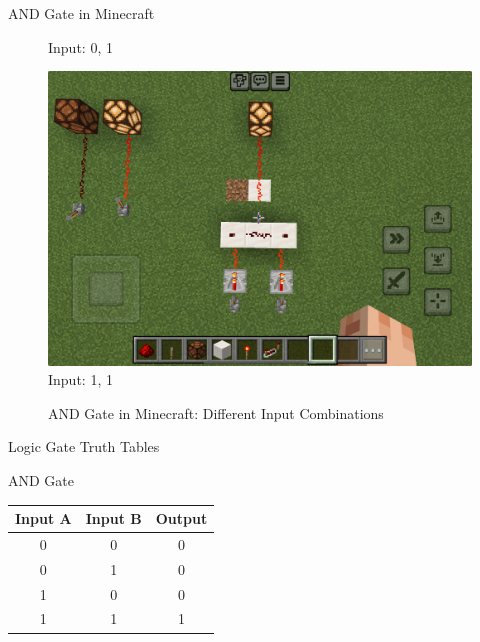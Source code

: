 \documentclass{beamer}
\begin{document}
\begin{frame}{AND Gate in Minecraft}
\begin{figure}[ht]
\begin{minipage}{0.32\textwidth}
            \small Input: 0, 1
        \end{minipage}
        \begin{minipage}{0.32\textwidth}
            \centering
            \includegraphics[width=\textwidth]{images/andgate_11.png}\\
            \small Input: 1, 1
        \end{minipage}
        \caption{AND Gate in Minecraft: Different Input Combinations}
    \end{figure}
\end{frame}

\begin{frame}{Logic Gate Truth Tables}
    \begin{block}{AND Gate}
        \begin{tabular}{|c|c|c|}
            \hline
            Input A & Input B & Output \\
            \hline
            0 & 0 & 0 \\
            0 & 1 & 0 \\
            1 & 0 & 0 \\
            1 & 1 & 1 \\
            \hline
        \end{tabular}
    \end{block}
\end{frame}
\end{document}
